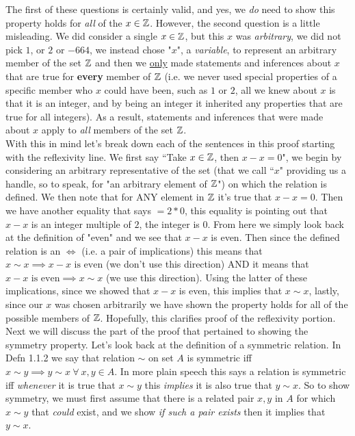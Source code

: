 \noindent The first of these questions is certainly valid, and yes, we \textit{do} need to show this property holds for \textit{all} of the $x\in {\mathbb{ Z}}$. However, the second question is a little misleading. We did consider a single $x\in {\mathbb{ Z}}$, but this $x$ was \textit{arbitrary}, we did not pick $1$, or $2$ or $-664$, we instead chose "$x$", a \textit{variable}, to represent an arbitrary member of the set ${\mathbb{ Z}}$ and then we \underline{only} made statements and inferences about $x$ that are true for \textbf{every} member of ${\mathbb{ Z}}$ (i.e. we never used special properties of a specific member who $x$ could have been, such as $1$ or $2$, all we knew about $x$ is that it is an integer, and by being an integer it inherited any properties that are true for all integers). As a result, statements and inferences that were made about $x$ apply to \textit{all} members of the set ${\mathbb{ Z}}$. \steezybreak\\
With this in mind let's break down each of the sentences in this proof starting with the reflexivity line. We first say ``Take $x\in{\mathbb{ Z}}$, then $x-x=0$", we begin by considering an arbitrary representative of the set (that we call ``$x$" providing us a handle, so to speak, for "an arbitrary element of ${\mathbb{ Z}}$") on which the relation is defined. We then note that for ANY element in ${\mathbb{ Z}}$ it's true that $x-x=0$. Then we have another equality that says $=2*0$, this equality is pointing out that $x-x$ is an integer multiple of $2$, the integer is $0$. From here we simply look back at the definition of "even" and we see that $x-x$ is even. Then since the defined relation is an $\iff$ (i.e. a pair of implications) this means that $x\sim x \implies x-x \text{ is even}$ (we don't use this direction) AND it means that $x-x \text{ is even}\implies x\sim x$ (we use this direction). Using the latter of these implications, since we showed that $x-x$ is even, this implies that $x\sim x$, lastly, since our $x$ was chosen arbitrarily we have shown the property holds for all of the possible members of ${\mathbb{ Z}}$. Hopefully, this clarifies proof of the reflexivity portion.\steezybreak\\
Next we will discuss the part of the proof that pertained to showing the symmetry property. Let's look back at the definition of a symmetric relation. In Defn 1.1.2 we say that relation $\sim$ on set $A$ is symmetric iff $x\sim y \implies y\sim x \ \forall \ x,y \in A$. In more plain speech this says a relation is symmetric iff \textit{whenever} it is true that $x\sim y$ this \textit{implies} it is also true that $y\sim x$. So to show symmetry, we must first assume that there is a related pair $x,y$ in $A$ for which $x\sim y$ that \textit{could} exist, and we show \textit{if such a pair exists} then it implies that $y\sim x$.

